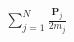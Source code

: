 \documentclass[preview]{standalone}
\begin{document}
\begin{align*}
\sum_{j=1}^{N}\frac{\mathbf{P}_j}{2m_j}
\end{align*}
\end{document}
